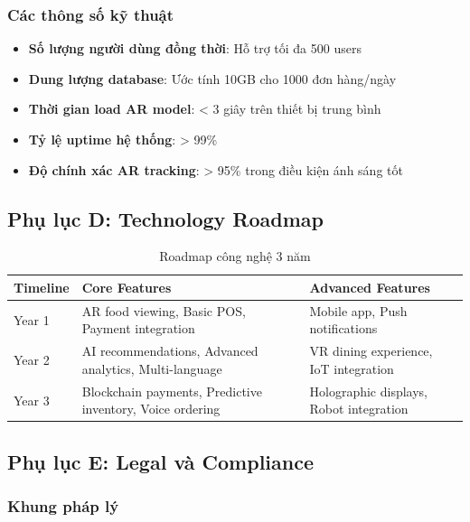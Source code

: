\documentclass[12pt,a4paper]{article}
\begin{document}
\subsubsection{Các thông số kỹ thuật}

\begin{itemize}[leftmargin=1cm]
    \item \textbf{Số lượng người dùng đồng thời}: Hỗ trợ tối đa 500 users
    \item \textbf{Dung lượng database}: Ước tính 10GB cho 1000 đơn hàng/ngày
    \item \textbf{Thời gian load AR model}: < 3 giây trên thiết bị trung bình
    \item \textbf{Tỷ lệ uptime hệ thống}: > 99\%
    \item \textbf{Độ chính xác AR tracking}: > 95\% trong điều kiện ánh sáng tốt
\end{itemize}

\subsection{Phụ lục D: Technology Roadmap}

\begin{table}[H]
\centering
\caption{Roadmap công nghệ 3 năm}
\label{tab:tech-roadmap}
\begin{tabular}{@{}p{2cm}p{5cm}p{5cm}@{}}
\toprule
\textbf{Timeline} & \textbf{Core Features} & \textbf{Advanced Features} \\
\midrule
Year 1 & AR food viewing, Basic POS, Payment integration & Mobile app, Push notifications \\
Year 2 & AI recommendations, Advanced analytics, Multi-language & VR dining experience, IoT integration \\
Year 3 & Blockchain payments, Predictive inventory, Voice ordering & Holographic displays, Robot integration \\
\bottomrule
\end{tabular}
\end{table}

\subsection{Phụ lục E: Legal và Compliance}

\subsubsection{Khung pháp lý}
\end{document}
